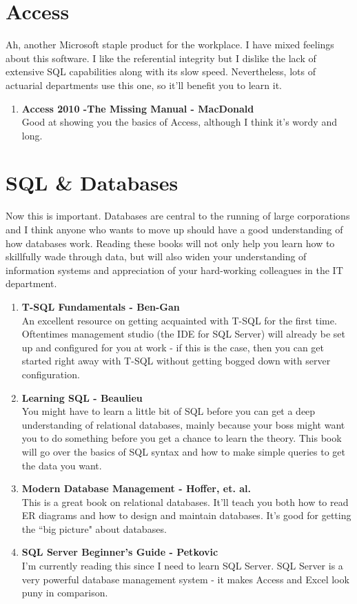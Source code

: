 \documentclass[oneside, titlepage]{article}
\begin{document}
\section{Access}
Ah, another Microsoft staple product for the workplace. I have mixed feelings about this software. I like the referential integrity but I dislike the lack of extensive SQL capabilities along with its slow speed. Nevertheless, lots of actuarial departments use this one, so it'll benefit you to learn it.

\begin{enumerate}
\item{\bfseries Access 2010 -The Missing Manual - MacDonald}\\
Good at showing you the basics of Access, although I think it's wordy and long.
\end{enumerate}

\section{SQL \& Databases}
Now this is important. Databases are central to the running of large corporations and I think anyone who wants to move up should have a good understanding of how databases work. Reading these books will not only help you learn how to skillfully wade through data, but will also widen your understanding of information systems and appreciation of your hard-working colleagues in the IT department.

\begin{enumerate}
\item{\bfseries T-SQL Fundamentals - Ben-Gan}\\
An excellent resource on getting acquainted with T-SQL for the first time. Oftentimes management studio (the IDE for SQL Server) will already be set up and configured for you at work - if this is the case, then you can get started right away with T-SQL without getting bogged down with server configuration.

\item{\bfseries Learning SQL - Beaulieu}\\
You might have to learn a little bit of SQL before you can get a deep understanding of relational databases, mainly because your boss might want you to do something before you get a chance to learn the theory. This book will go over the basics of SQL syntax and how to make simple queries to get the data you want.

\item{\bfseries Modern Database Management - Hoffer, et. al.}\\
This is a great book on relational databases. It'll teach you both how to read ER diagrams and how to design and maintain databases. It's good for getting the ``big picture" about databases.

\item{\bfseries SQL Server Beginner's Guide - Petkovic}\\
I'm currently reading this since I need to learn SQL Server. SQL Server is a very powerful database management system - it makes Access and Excel look puny in comparison. 

\end{enumerate}
\end{document}
